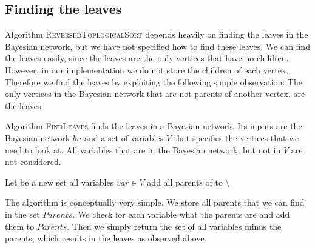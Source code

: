 \documentclass[10pt,a4paper]{article}
\begin{document}
\subsection{Finding the leaves}
Algorithm \textsc{ReversedToplogicalSort} depends heavily on finding the leaves in the Bayesian network, but we have not specified how to find these leaves. We can find the leaves easily, since the leaves are the only vertices that have no children. However, in our implementation we do not store the children of each vertex. Therefore we find the leaves by exploiting the following simple observation: The only vertices in the Bayesian network that are not parents of another vertex, are the leaves. 

Algorithm \textsc{FindLeaves} finds the leaves in a Bayesian network. Its inputs are the Bayesian network $bn$ and a set of variables $V$ that specifies the vertices that we need to look at. All variables that are in the Bayesian network, but not in $V$ are not considered.
\begin{codebox}
\li Let  be a new set
\li \For all variables $var \in V$ \Do 
\li	add all parents of  to 
\End
\li \Return {} $\setminus$ 
\end{codebox}
The algorithm is conceptually very simple. We store all parents that we can find in the set $Parents$. We check for each variable what the parents are and add them to $Parents$. Then we simply return the set of all variables minus the parents, which results in the leaves as observed above.
\end{document}
